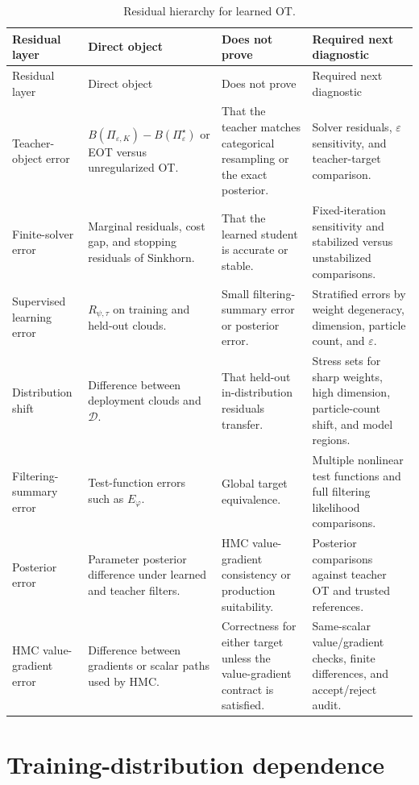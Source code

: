 \begin{longtable}{@{}p{} p{} p{} p{}@{}}
\caption{Residual hierarchy for learned OT.}
\label{tab:bf-learned-ot-residual-hierarchy}\\
\toprule
Residual layer & Direct object & Does not prove & Required next diagnostic \\
\midrule
\endfirsthead
\toprule
Residual layer & Direct object & Does not prove & Required next diagnostic \\
\midrule
\endhead
Teacher-object error &
$B(\Pi_{\varepsilon,K})-B(\Pi_\varepsilon^\star)$ or EOT versus unregularized OT. &
That the teacher matches categorical resampling or the exact posterior. &
Solver residuals, $\varepsilon$ sensitivity, and teacher-target comparison. \\
Finite-solver error &
Marginal residuals, cost gap, and stopping residuals of Sinkhorn. &
That the learned student is accurate or stable. &
Fixed-iteration sensitivity and stabilized versus unstabilized comparisons. \\
Supervised learning error &
$R_{\psi,\tau}$ on training and held-out clouds. &
Small filtering-summary error or posterior error. &
Stratified errors by weight degeneracy, dimension, particle count, and
$\varepsilon$. \\
Distribution shift &
Difference between deployment clouds and $\mathcal D$. &
That held-out in-distribution residuals transfer. &
Stress sets for sharp weights, high dimension, particle-count shift, and model
regions. \\
Filtering-summary error &
Test-function errors such as $E_\varphi$. &
Global target equivalence. &
Multiple nonlinear test functions and full filtering likelihood comparisons. \\
Posterior error &
Parameter posterior difference under learned and teacher filters. &
HMC value-gradient consistency or production suitability. &
Posterior comparisons against teacher OT and trusted references. \\
HMC value-gradient error &
Difference between gradients or scalar paths used by HMC. &
Correctness for either target unless the value-gradient contract is satisfied. &
Same-scalar value/gradient checks, finite differences, and accept/reject audit. \\
\bottomrule
\end{longtable}

\section{Training-distribution dependence}
\label{sec:bf-learned-ot-training-distribution}

